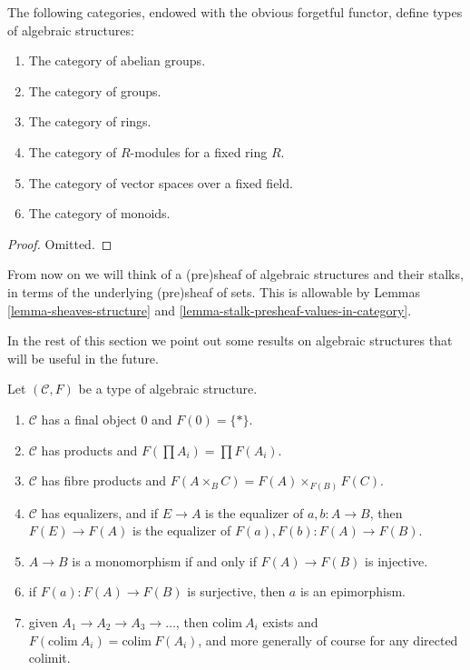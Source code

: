 \begin{lemma}
\label{lemma-list-algebraic-structures}
The following categories, endowed with the obvious forgetful
functor, define types of algebraic structures:
\begin{enumerate}
\item The category of abelian groups.
\item The category of groups.
\item The category of rings.
\item The category of $R$-modules for a fixed ring $R$.
\item The category of vector spaces over a fixed field.
\item The category of monoids.
\end{enumerate}
\end{lemma}

\begin{proof}
Omitted.
\end{proof}

\noindent
From now on we will think of a (pre)sheaf of algebraic structures
and their stalks, in terms of the underlying (pre)sheaf of sets.
This is allowable by Lemmas \ref{lemma-sheaves-structure} and
\ref{lemma-stalk-presheaf-values-in-category}.

\medskip\noindent
In the rest of this section we point out some results
on algebraic structures that will be useful in the future.

\begin{lemma}
\label{lemma-properties-algebraic-structures}
Let $(\mathcal{C}, F)$ be a type of algebraic structure.
\begin{enumerate}
\item $\mathcal{C}$ has a final object $0$ and $F(0) = \{ * \}$.
\item $\mathcal{C}$ has products and $F(\prod A_i) = \prod F(A_i)$.
\item $\mathcal{C}$ has fibre products and
$F(A\times_BC) = F(A)\times_{F(B)}F(C)$.
\item $\mathcal{C}$ has equalizers, and if $E \to A$
is the equalizer of $a, b : A \to B$, then
$F(E) \to F(A)$ is the equalizer of $F(a), F(b) : F(A) \to F(B)$.
\item $A \to B$ is a monomorphism if and only if 
$F(A) \to F(B)$ is injective.
\item if $F(a) : F(A) \to F(B)$ is surjective, then
$a$ is an epimorphism.
\item given $A_1 \to A_2 \to A_3 \to \ldots$, then
$\text{colim}\ A_i$ exists and $F(\text{colim}\ A_i)=\text{colim}\ F(A_i)$,
and more generally of course for any directed colimit.
\end{enumerate}
\end{lemma}

